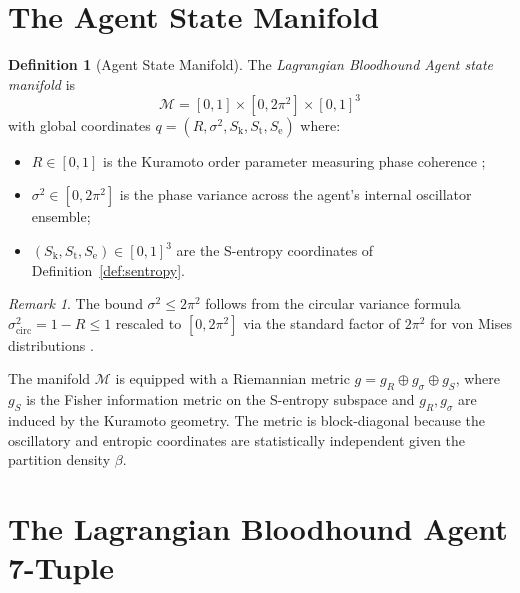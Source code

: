 \documentclass[twocolumn,11pt,a4paper]{article}
\theoremstyle{plain}
\theoremstyle{definition}
\newtheorem{definition}[theorem]{Definition}
\theoremstyle{remark}
\newtheorem{remark}[theorem]{Remark}
\newcommand{\Sk}{S_{\mathrm{k}}}
\newcommand{\St}{S_{\mathrm{t}}}
\newcommand{\Se}{S_{\mathrm{e}}}
\newcommand{\Mspace}{\mathcal{M}}
\begin{document}
\section{The Agent State Manifold}
\label{sec:manifold}

\begin{definition}[Agent State Manifold]
\label{def:manifold}
The \emph{Lagrangian Bloodhound Agent state manifold} is
\begin{equation}
  \Mspace = [0,1] \times [0,2\pi^2] \times [0,1]^3
\end{equation}
with global coordinates $q = (R, \sigma^2, \Sk, \St, \Se)$ where:
\begin{itemize}[noitemsep]
  \item $R \in [0,1]$ is the Kuramoto order parameter measuring phase coherence \citep{kuramoto1984,acebron2005};
  \item $\sigma^2 \in [0,2\pi^2]$ is the phase variance across the agent's internal oscillator ensemble;
  \item $(\Sk,\St,\Se) \in [0,1]^3$ are the S-entropy coordinates of Definition~\ref{def:sentropy}.
\end{itemize}
\end{definition}

\begin{remark}
The bound $\sigma^2 \le 2\pi^2$ follows from the circular variance formula $\sigma^2_{\mathrm{circ}} = 1 - R \le 1$ rescaled to $[0,2\pi^2]$ via the standard factor of $2\pi^2$ for von Mises distributions \citep{kuramoto1984}.
\end{remark}

The manifold $\Mspace$ is equipped with a Riemannian metric $g = g_R \oplus g_{\sigma} \oplus g_{S}$, where $g_S$ is the Fisher information metric on the S-entropy subspace and $g_R, g_\sigma$ are induced by the Kuramoto geometry.  The metric is block-diagonal because the oscillatory and entropic coordinates are statistically independent given the partition density $\beta$.

\section{The Lagrangian Bloodhound Agent 7-Tuple}
\label{sec:7tuple}
\end{document}
